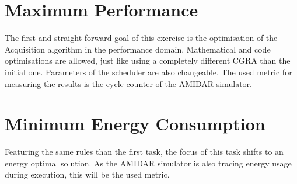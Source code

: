 	\section{Maximum Performance} %
	\label{sec:task_max_perf}
		The first and straight forward goal of this exercise is the optimisation of the Acquisition algorithm in the performance domain. Mathematical and code optimisations are allowed, just like using a completely different CGRA than the initial one. Parameters of the scheduler are also changeable.
		The used metric for measuring the results is the cycle counter of the AMIDAR simulator.

	\section{Minimum Energy Consumption} %
	\label{sec:task_min_energy}
		Featuring the same rules than the first task, the focus of this task shifts to an energy optimal solution. As the AMIDAR simulator is also tracing energy usage during execution, this will be the used metric.
